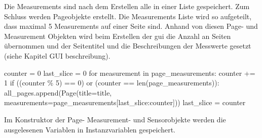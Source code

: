 Die Measurements sind nach dem Erstellen alle in einer Liste gespeichert. Zum Schluss werden Pageobjekte erstellt. Die Measurements Liste wird so aufgeteilt, dass maximal 5 Measurements auf einer Seite sind. Anhand von diesen Page- und Measurement Objekten wird beim Erstellen der \acs{gui} die Anzahl an Seiten übernommen und der Seitentitel und die Beschreibungen der Messwerte gesetzt (siehe Kapitel GUI beschreibung). 
\begin{pythoncode}
counter = 0
last_slice = 0
for measurement in page_measurements:
	counter += 1
	if ((counter \% 5) == 0) or (counter == len(page_measurements)):
		all_pages.append(Page(title=title, measurements=page_measurements[last_slice:counter]))
		last_slice = counter
\end{pythoncode}


Im Konstruktor der Page- Measurement- und Sensorobjekte werden die ausgelesenen Variablen in Instanzvariablen gespeichert.